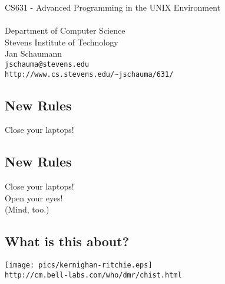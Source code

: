 \documentclass[xga]{xdvislides}
\begin{document}
\setfontphv

\lhead{\slidetitle}
\cfoot{\relax}
\rfoot{\Gray{\today}}

\vspace*{\fill}
\begin{center}
	\Hugesize
		CS631 - Advanced Programming in the UNIX Environment\\ [1em]
	\hspace*{5mm}\blueline\\ [1em]
	\Normalsize
		Department of Computer Science\\
		Stevens Institute of Technology\\
		Jan Schaumann\\
		\verb+jschauma@stevens.edu+\\
		\verb+http://www.cs.stevens.edu/~jschauma/631/+
\end{center}
\vspace*{\fill}

\subsection{New Rules}
\Hugesize
\vspace*{\fill}
\begin{center}
Close your laptops!
\end{center}
\vspace*{\fill}
\Normalsize

\subsection{New Rules}
\Hugesize
\vspace*{\fill}
\begin{center}
Close your laptops! \\
\vspace{.5in}
Open your eyes! \\
\small
(Mind, too.)
\end{center}
\vspace*{\fill}
\Normalsize


\subsection{What is this about?}
\begin{center}
\texttt{[image: pics/kernighan-ritchie.eps]} \\
\verb+http://cm.bell-labs.com/who/dmr/chist.html+
\end{center}
\end{document}

